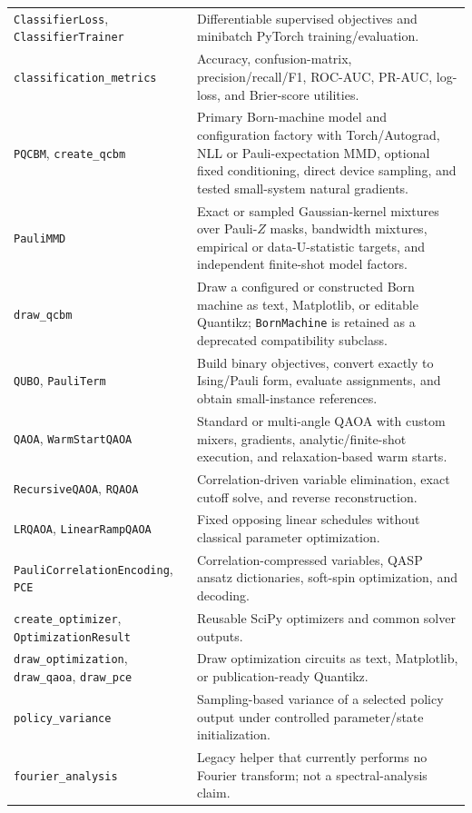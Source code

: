 \documentclass[10pt]{article}
\newcommand{\code}[1]{\texttt{#1}}
\begin{document}
\begin{table}[H]
\begin{tabularx}{\textwidth}{@{}p{}X@{}}
\code{ClassifierLoss}, \code{ClassifierTrainer} & Differentiable supervised objectives and minibatch PyTorch training/evaluation. \\
\code{classification\_metrics} & Accuracy, confusion-matrix, precision/recall/F1, ROC-AUC, PR-AUC, log-loss, and Brier-score utilities. \\
\code{PQCBM}, \code{create\_qcbm} & Primary Born-machine model and configuration factory with Torch/Autograd, NLL or Pauli-expectation MMD, optional fixed conditioning, direct device sampling, and tested small-system natural gradients. \\
\code{PauliMMD} & Exact or sampled Gaussian-kernel mixtures over Pauli-$Z$ masks, bandwidth mixtures, empirical or data-U-statistic targets, and independent finite-shot model factors. \\
\code{draw\_qcbm} & Draw a configured or constructed Born machine as text, Matplotlib, or editable Quantikz; \code{BornMachine} is retained as a deprecated compatibility subclass. \\
\code{QUBO}, \code{PauliTerm} & Build binary objectives, convert exactly to Ising/Pauli form, evaluate assignments, and obtain small-instance references. \\
\code{QAOA}, \code{WarmStartQAOA} & Standard or multi-angle QAOA with custom mixers, gradients, analytic/finite-shot execution, and relaxation-based warm starts. \\
\code{RecursiveQAOA}, \code{RQAOA} & Correlation-driven variable elimination, exact cutoff solve, and reverse reconstruction. \\
\code{LRQAOA}, \code{LinearRampQAOA} & Fixed opposing linear schedules without classical parameter optimization. \\
\code{PauliCorrelationEncoding}, \code{PCE} & Correlation-compressed variables, QASP ansatz dictionaries, soft-spin optimization, and decoding. \\
\code{create\_optimizer}, \code{OptimizationResult} & Reusable SciPy optimizers and common solver outputs. \\
\code{draw\_optimization}, \code{draw\_qaoa}, \code{draw\_pce} & Draw optimization circuits as text, Matplotlib, or publication-ready Quantikz. \\
\code{policy\_variance} & Sampling-based variance of a selected policy output under controlled parameter/state initialization. \\
\code{fourier\_analysis} & Legacy helper that currently performs no Fourier transform; not a spectral-analysis claim. \\

\end{tabularx}
\end{table}
\end{document}
